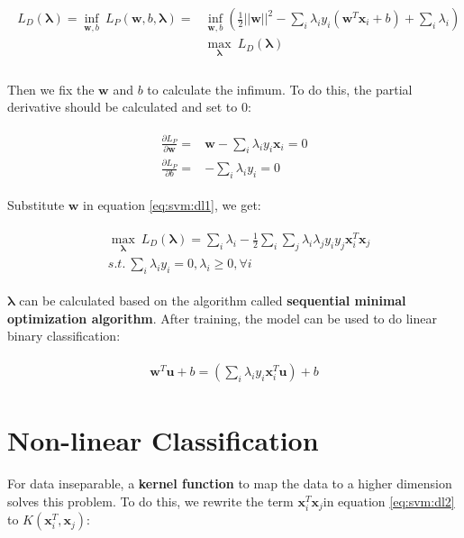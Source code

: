\begin{align}
\begin{split}
L_D(\mathbf{\lambda}) = \inf_{\mathbf{w}, b} \ L_P(\mathbf{w}, b, \mathbf{\lambda}) =& \inf_{\mathbf{w}, b} \left( \frac{1}{2}||\mathbf{w}||^2 - \sum_i\lambda_i y_i(\mathbf{w}^T\mathbf{x}_i+b) + \sum_i\lambda_i \right)\\
&\max_\mathbf{\lambda} \ L_D(\mathbf{\lambda}) \\
\label{eq:svm:dl1}
\end{split}
\end{align}

Then we fix the $\mathbf{w}$ and $b$ to calculate the infimum. 
To do this, the partial derivative should be calculated and set to $0$:

\begin{align}
\begin{split}
\frac{\partial{L_P}}{\partial{\mathbf{w}}} =& \mathbf{w} - \sum_i\lambda_iy_i\mathbf{x}_i = 0 \\
\frac{\partial{L_P}}{\partial{b}} =& -\sum_i\lambda_iy_i = 0
\end{split}
\end{align}

Substitute $\mathbf{w}$ in equation \ref{eq:svm:dl1}, we get:

\begin{align}
\begin{split}
&\max_\mathbf{\lambda} \ L_D(\mathbf{\lambda}) = \sum_i\lambda_i - \frac{1}{2} \sum_i\sum_j\lambda_i\lambda_jy_iy_j\mathbf{x}_i^T\mathbf{x}_j\\
 &s.t. \ \sum_i\lambda_iy_i = 0, \lambda_i \geq 0, \forall i
\label{eq:svm:dl2}
\end{split}
\end{align}

$\mathbf{\lambda}$ can be calculated based on the algorithm called \textbf{sequential minimal optimization algorithm}. After training, the model can be used to do linear binary classification:

\begin{align}
\begin{split}
\mathbf{w}^T \mathbf{u} + b =  \left(\sum_i\lambda_iy_i\mathbf{x}_i^T\mathbf{u}\right) + b 
\end{split}
\end{align}

\section{Non-linear Classification}
For data inseparable, a \textbf{kernel function} to map the data to a higher dimension solves this problem. 
To do this, we rewrite the term $ \mathbf{x}_i^T\mathbf{x}_j $in equation \ref{eq:svm:dl2} to $K(\mathbf{x}_i^T, \mathbf{x}_j )$:


